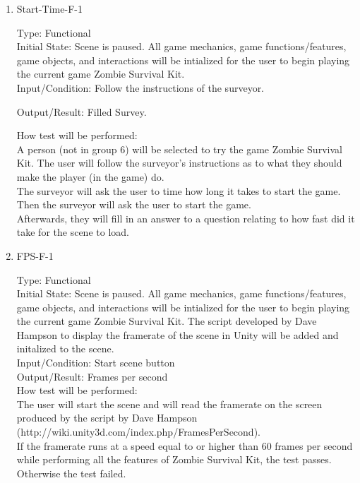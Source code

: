 \documentclass[12pt, titlepage]{article}
\newcounter{ftnum}
\newcounter{nftnum}
\begin{document}
\begin{enumerate}
	
	\item{Start-Time-F-1\\}  \label{NF5}
	
	Type: Functional \\
	
	Initial State: Scene is paused. All game mechanics, game functions/features, game objects, and interactions will be intialized for the user to begin playing the current game Zombie Survival Kit. \\
	
	Input/Condition: Follow the instructions of the surveyor.
	
	Output/Result: Filled Survey.
	
	How test will be performed:\\ A person (not in group 6) will be selected to try the game Zombie Survival Kit. The user will follow the surveyor's instructions as to what they should make the player (in the game) do. \\ 
	The surveyor will ask the user to time how long it takes to start the game. Then the surveyor will ask the user to start the game. \\
	Afterwards, they will fill in an answer to a question relating to how fast did it take for the scene to load. \\
	
	\item{FPS-F-1\\}  \label{NF6}
	
	Type: Functional \\
	
	Initial State: Scene is paused. All game mechanics, game functions/features, game objects, and interactions will be intialized for the user to begin playing the current game Zombie Survival Kit. The script developed by Dave Hampson to display the framerate of the scene in Unity will be added and initalized to the scene. \\
	
	Input/Condition: Start scene button \\
	
	Output/Result: Frames per second \\
	
	How test will be performed:\\ The user will start the scene and will read the framerate on the screen produced by the script by Dave Hampson (http://wiki.unity3d.com/index.php/FramesPerSecond). \\ 
	If the framerate runs at a speed equal to or higher than 60 frames per second while performing all the features of Zombie Survival Kit, the test passes. Otherwise the test failed.\\
	

\end{enumerate}
\end{document}
